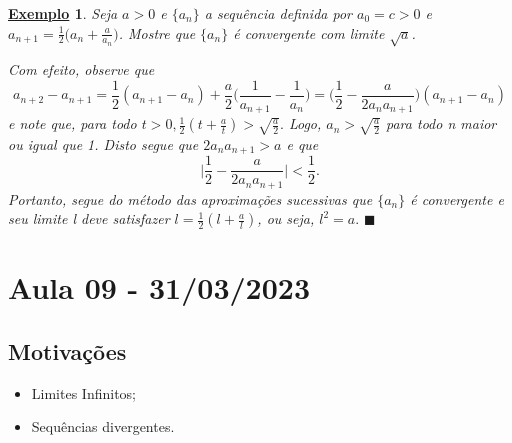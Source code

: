 \documentclass{article}
\newtheorem{example}{\underline{Exemplo}}
\renewcommand\qedsymbol{$\blacksquare$}
\begin{document}
 \begin{example}
   Seja $a > 0$ e $\{a_{n}\}$ a sequ\^encia definida por $a_{0} = c > 0$ e $a_{n+1}=\displaystyle \frac{1}{2}\biggl(a_{n} + \frac{a}{a_{n}}\biggr)$. Mostre que 
   $\{a_{n}\}$ \'e convergente com limite $\sqrt{a}$. 

   Com efeito, observe que 
     $$
       a_{n+2} - a_{n+1} = \frac{1}{2}(a_{n+1}-a_{n}) + \frac{a}{2}\biggl(\frac{1}{a_{n+1}}-\frac{1}{a_{n}}\biggr) = \biggl(\frac{1}{2} - \frac{a}{2a_{n}a_{n+1}}\biggr)(a_{n+1}-a_{n})
     $$
     e note que, para todo $t > 0, \frac{1}{2}(t + \frac{a}{t}) > \sqrt{\frac{a}{2}}.$ Logo, $a_{n} > \sqrt{\frac{a}{2}}$ para todo n maior ou igual que 1.
Disto segue que $2a_{n}a_{n+1} > a$ e que 
  $$
    \biggl|\frac{1}{2} - \frac{a}{2a_{n}a_{n+1}}\biggr| < \frac{1}{2}.
  $$
  Portanto, segue do m\'etodo das aproxima\c c\~oes sucessivas que $\{a_{n}\}$ \'e convergente e seu limite l deve satisfazer 
 $l = \frac{1}{2}(l + \frac{a}{l})$, ou seja, $l^{2} = a.$ \qedsymbol
 \end{example}
\newpage

\section{Aula 09 - 31/03/2023}
\subsection{Motiva\c c\~oes}
  \begin{itemize}
    \item Limites Infinitos;
    \item Sequ\^encias divergentes.
  \end{itemize}
\end{document}

